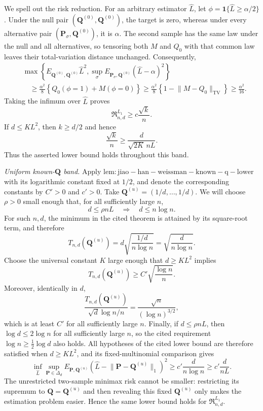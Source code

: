 We spell out the risk reduction.  For an arbitrary estimator \(\widehat L\), let \(\phi=\mathbf 1\{\widehat L\ge\alpha/2\}\).  Under the null pair \((\mathbf Q^{(0)},\mathbf Q^{(0)})\), the target is zero, whereas under every alternative pair \((\mathbf P_\sigma,\mathbf Q^{(0)})\), it is \(\alpha\).  The second sample has the same law under the null and all alternatives, so tensoring both \(M\) and \(Q_0\) with that common law leaves their total-variation distance unchanged.  Consequently,
\[
 \begin{aligned}
 &\max\left\{
 E_{\mathbf Q^{(0)},\mathbf Q^{(0)}}\widehat L^2,
 \sup_\sigma E_{\mathbf P_\sigma,\mathbf Q^{(0)}}(\widehat L-\alpha)^2
 \right\}\\
 &\quad\ge
 \frac{\alpha^2}{8}
 \left\{Q_0(\phi=1)+M(\phi=0)\right\}
 \ge \frac{\alpha^2}{8}
 \left\{1-\lVert M-Q_0\rVert_{\mathrm{TV}}\right\}
 \ge\frac{\alpha^2}{16}.
 \end{aligned}
\]
Taking the infimum over \(\widehat L\) proves
\[
 \mathfrak R^{L_1}_{n,d}\ge c\frac{\sqrt{k}}{n}.
\]
If \(d\le K L^2\), then \(k\ge d/2\) and hence
\[
 \frac{\sqrt{k}}n
 \ge \frac{d}{\sqrt{2K}\,nL}.
\]
Thus the asserted lower bound holds throughout this band.

\emph{Uniform known-\(\mathbf Q\) band.}
Apply \(\mathrm{lem:jiao-han-weissman-known-q-lower}\) with its logarithmic constant fixed at \(1/2\), and denote the corresponding constants by \(C'>0\) and \(c'>0\).  Take \(\mathbf Q^{(u)}=(1/d,\ldots,1/d)\).  We will choose \(\rho>0\) small enough that, for all sufficiently large \(n\),
\[
 d\le\rho nL\quad\Longrightarrow\quad d\le n\log n.
\]
For such \(n,d\), the minimum in the cited theorem is attained by its square-root term, and therefore
\[
 T_{n,d}(\mathbf Q^{(u)})
 =d\sqrt{\frac{1/d}{n\log n}}
 =\sqrt{\frac d{n\log n}}.
\]
Choose the universal constant \(K\) large enough that \(d\ge K L^2\) implies
\[
 T_{n,d}(\mathbf Q^{(u)})
 \ge C'\sqrt{\frac{\log n}{n}}.
\]
Moreover, identically in \(d\),
\[
 \frac{T_{n,d}(\mathbf Q^{(u)})}{\sqrt d\log n/n}
 =\frac{\sqrt n}{(\log n)^{3/2}},
\]
which is at least \(C'\) for all sufficiently large \(n\).  Finally, if \(d\le\rho nL\), then \(\log d\le2\log n\) for all sufficiently large \(n\), so the cited requirement \(\log n\ge\frac12\log d\) also holds.  All hypotheses of the cited lower bound are therefore satisfied when \(d\ge K L^2\), and its fixed-multinomial comparison gives
\[
 \inf_{\widehat L}
 \sup_{\mathbf P\in\Delta_d}
 E_{\mathbf P,\mathbf Q^{(u)}}
 \left(\widehat L-\lVert\mathbf P-\mathbf Q^{(u)}\rVert_1\right)^2
 \ge c'\frac d{n\log n}
 \ge c'\frac d{nL}.
\]
The unrestricted two-sample minimax risk cannot be smaller: restricting its supremum to \(\mathbf Q=\mathbf Q^{(u)}\) and then revealing this fixed \(\mathbf Q^{(u)}\) only makes the estimation problem easier.  Hence the same lower bound holds for \(\mathfrak R^{L_1}_{n,d}\).


